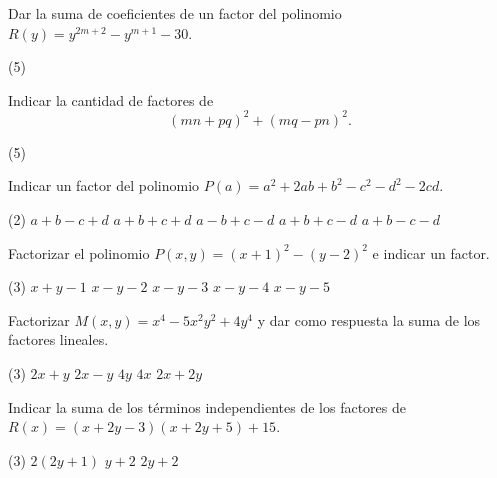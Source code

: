\begin{multicols}{2}
    \begin{exercise}
        Dar la suma de coeficientes de un factor del polinomio $R(y) = y^{2m + 2} - y^{m + 1} - 30$.
        \begin{tasks}(5)
        \end{tasks}
    \end{exercise}

    \begin{exercise}
        Indicar la cantidad de factores de
        \[
            (mn + pq)^2 + (mq - pn)^2.
        \]
        \begin{tasks}(5)
        \end{tasks}
    \end{exercise}

    \begin{exercise}
        Indicar un factor del polinomio $P(a) = a^2 + 2ab + b^2 - c^2 - d^2 - 2cd$.
        \begin{tasks}(2)
            \task $a + b - c + d$
            \task $a + b + c + d$
            \task $a - b + c - d$
            \task $a + b + c - d$
            \task $a + b - c - d$
        \end{tasks}
    \end{exercise}

    \begin{exercise}
        Factorizar el polinomio $P(x, y) = (x + 1)^2 - (y - 2)^2$ e indicar un factor.
        \begin{tasks}(3)
            \task $x + y - 1$
            \task $x - y - 2$
            \task $x - y - 3$
            \task $x - y - 4$
            \task $x - y - 5$
        \end{tasks}
    \end{exercise}

    \begin{exercise}
        Factorizar $M(x,y) = x^4 - 5x^2 y^2 + 4y^4$ y dar como respuesta la suma de los factores lineales.
        \begin{tasks}(3)
            \task $2x + y$
            \task $2x - y$
            \task $4y$
            \task $4x$
            \task $2x + 2y$
        \end{tasks}
    \end{exercise}

    \begin{exercise}
        Indicar la suma de los términos independientes de los factores de $R(x) = (x + 2y - 3)(x + 2y + 5) + 15$.
        \begin{tasks}(3)
            \task $2(2y + 1)$
            \task $y + 2$
            \task $2y + 2$
        \end{tasks}
    \end{exercise}


\end{multicols}
